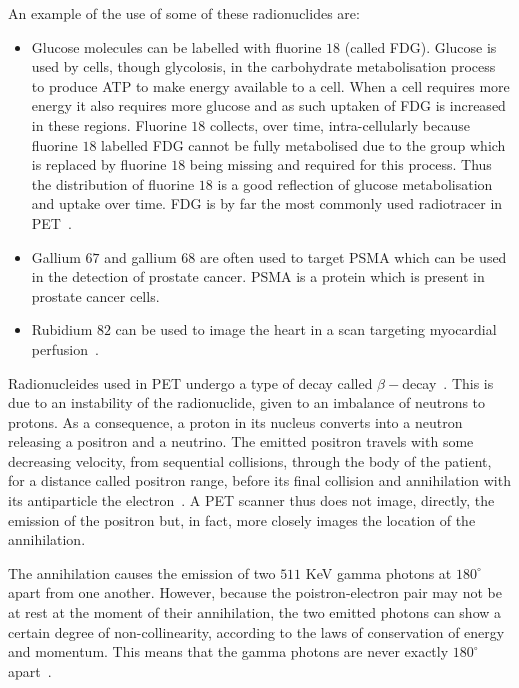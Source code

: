             An example of the use of some of these radionuclides are:
            
            \begin{itemize}
                \item Glucose molecules can be labelled with fluorine $18$ (called \gls{FDG}). Glucose is used by cells, though glycolosis, in the carbohydrate metabolisation process to produce \gls{ATP} to make energy available to a cell. When a cell requires more energy it also requires more glucose and as such uptaken of \gls{FDG} is increased in these regions. Fluorine $18$ collects, over time, intra-cellularly because fluorine $18$ labelled \gls{FDG} cannot be fully metabolised due to the group which is replaced by fluorine $18$ being missing and required for this process. Thus the distribution of fluorine $18$ is a good reflection of glucose metabolisation and uptake over time. \gls{FDG} is by far the most commonly used radiotracer in \gls{PET}~.
                
                \item Gallium $67$ and gallium $68$ are often used to target \gls{PSMA} which can be used in the detection of prostate cancer. \gls{PSMA} is a protein which is present in prostate cancer cells.
                
                \item Rubidium $82$ can be used to image the heart in a scan targeting myocardial perfusion~.
            \end{itemize}
            
            Radionucleides used in \gls{PET} undergo a type of decay called $\beta-$decay~. This is due to an instability of the radionuclide, given to an imbalance of neutrons to protons. As a consequence, a proton in its nucleus converts into a neutron releasing a positron and a neutrino. The emitted positron travels with some decreasing velocity, from sequential collisions, through the body of the patient, for a distance called positron range, before its final collision and annihilation with its antiparticle the electron~. A \gls{PET} scanner thus does not image, directly, the emission of the positron but, in fact, more closely images the location of the annihilation.
            
            The annihilation causes the emission of two $511$ \gls{KeV} gamma photons at $180^{\circ}$ apart from one another. However, because the poistron-electron pair may not be at rest at the moment of their annihilation, the two emitted photons can show a certain degree of non-collinearity, according to the laws of conservation of energy and momentum. This means that the gamma photons are never exactly $180^{\circ}$ apart~.%
            
